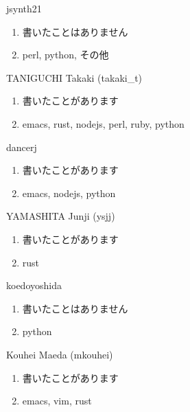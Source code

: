 \begin{prework}{ jsynth21 }
  \begin{enumerate}
  \item 書いたことはありません
  \item perl, python, その他
  \end{enumerate}
\end{prework}

\begin{prework}{ TANIGUCHI Takaki (takaki\_t) }
  \begin{enumerate}
  \item 書いたことがあります
  \item emacs, rust, nodejs, perl, ruby, python
  \end{enumerate}
\end{prework}

\begin{prework}{ dancerj }
  \begin{enumerate}
  \item 書いたことがあります
  \item emacs, nodejs, python
  \end{enumerate}
\end{prework}

\begin{prework}{ YAMASHITA Junji (ysjj) }
  \begin{enumerate}
  \item 書いたことがあります
  \item rust
  \end{enumerate}
\end{prework}

\begin{prework}{ koedoyoshida }
  \begin{enumerate}
  \item 書いたことはありません
  \item python
  \end{enumerate}
\end{prework}

\begin{prework}{ Kouhei Maeda (mkouhei) }
  \begin{enumerate}
  \item 書いたことがあります
  \item emacs, vim, rust
  \end{enumerate}
\end{prework}

